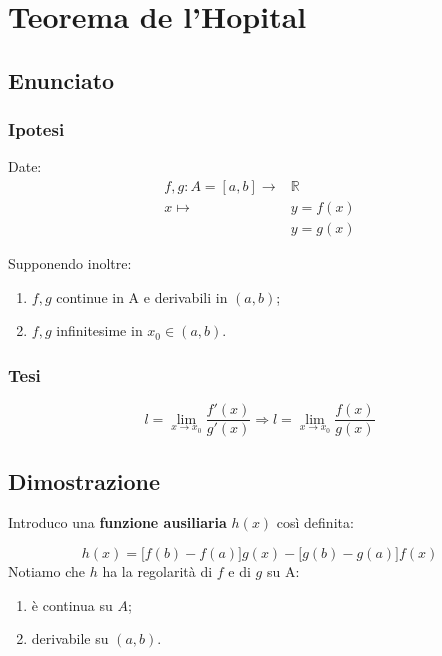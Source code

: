 \documentclass[../dimostrazioni]{subfiles}
\begin{document}
    \chapter{Teorema de l'Hopital}
    \label{teoHopital}

        \section*{Enunciato}

            \subsection*{Ipotesi}

                Date:
                \begin{align*}
                    f,g : A = [a, b] \longrightarrow &\mathbb{R}\\
                    x \longmapsto &y = f(x)\\
                                  &y = g(x) 
                \end{align*}

                Supponendo inoltre: 

                \begin{enumerate}
                    \indentitem \item \(f, g\) continue in A e derivabili in \( (a,b) \);
                    \indentitem \item \(f, g\) infinitesime in \(x_0 \in (a,b)\).
                \end{enumerate}

            \subsection*{Tesi}

                \[ 
                    l = \lim_{x \to x_0} \frac{f'(x)}{g'(x)} \Rightarrow l = \lim_{x \to x_0} \frac{f(x)}{g(x)}
                \]

        \section*{Dimostrazione}

            Introduco una \textbf{funzione ausiliaria} \(h(x)\) così definita:

            \[ 
                h(x) = \big[f(b) - f(a)\big]g(x) - \big[g(b) - g(a)\big]f(x)
            \]
            Notiamo che \(h\) ha la regolarità di \(f\) e di \(g\) su A:
            \begin{enumerate}
                \indentitem \item è continua su \( A \);
                \indentitem \item derivabile su \( (a, b) \).
            \end{enumerate}
\end{document}
